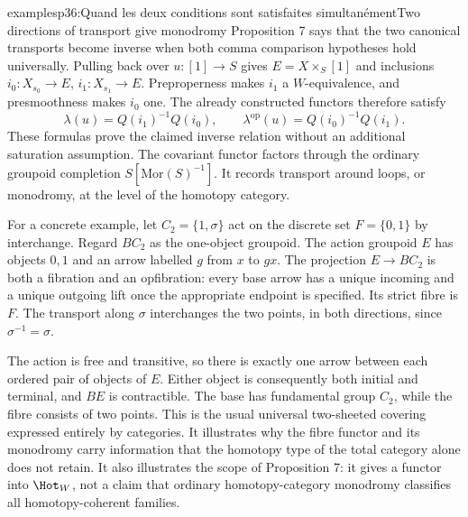 \begin{dcomment}{examples}{p36:Quand les deux conditions sont satisfaites simultanément}{Two directions of transport give monodromy}
Proposition 7 says that the two canonical transports become inverse when both comma comparison hypotheses hold universally. Pulling back over $u:[1]\to S$ gives $E=X\times_S[1]$ and inclusions $i_0:X_{s_0}\to E$, $i_1:X_{s_1}\to E$. Preproperness makes $i_1$ a $W$-equivalence, and presmoothness makes $i_0$ one. The already constructed functors therefore satisfy
\[
 \lambda(u)=Q(i_1)^{-1}Q(i_0),\qquad
 \lambda^{\mathrm{op}}(u)=Q(i_0)^{-1}Q(i_1).
\]
These formulas prove the claimed inverse relation without an additional saturation assumption. The covariant functor factors through the ordinary groupoid completion $S[\mathrm{Mor}(S)^{-1}]$. It records transport around loops, or monodromy, at the level of the homotopy category.

For a concrete example, let $C_2=\{1,\sigma\}$ act on the discrete set $F=\{0,1\}$ by interchange. Regard $BC_2$ as the one-object groupoid. The action groupoid $E$ has objects $0,1$ and an arrow labelled $g$ from $x$ to $gx$. The projection $E\to BC_2$ is both a fibration and an opfibration: every base arrow has a unique incoming and a unique outgoing lift once the appropriate endpoint is specified. Its strict fibre is $F$. The transport along $\sigma$ interchanges the two points, in both directions, since $\sigma^{-1}=\sigma$.

The action is free and transitive, so there is exactly one arrow between each ordered pair of objects of $E$. Either object is consequently both initial and terminal, and $BE$ is contractible. The base has fundamental group $C_2$, while the fibre consists of two points. This is the usual universal two-sheeted covering expressed entirely by categories. It illustrates why the fibre functor and its monodromy carry information that the homotopy type of the total category alone does not retain. It also illustrates the scope of Proposition 7: it gives a functor into $\Hot_W$, not a claim that ordinary homotopy-category monodromy classifies all homotopy-coherent families.
\end{dcomment}

